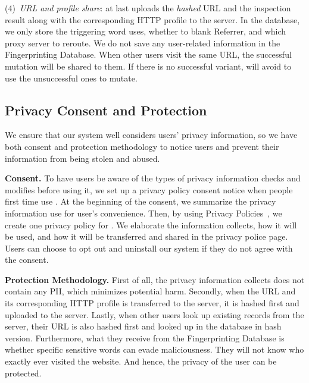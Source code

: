 (4)~\emph{URL and profile share}:
\spartacus at last uploads the \emph{hashed} URL and the inspection result along with the corresponding HTTP profile to the server.
In the database, we only store the triggering word \spartacus uses, whether to blank Referrer, and which proxy server to reroute.
We do not save any user-related information in the Fingerprinting Database.
When other users visit the same URL, the successful mutation will be shared to them.
If there is no successful variant, \spartacus will avoid to use the unsuccessful ones to mutate.


\subsection{Privacy Consent and Protection}

We ensure that our \spartacus system well considers users' privacy information,
so we have both consent and protection methodology to notice users and prevent their information from being stolen and abused.

\noindent
\textbf{Consent.}
To have users be aware of the types of privacy information \spartacus checks and modifies before using it,
we set up a privacy policy consent notice when people first time use \spartacus.
At the beginning of the consent, we summarize the privacy information \spartacus use for user's convenience.
Then, by using Privacy Policies~\cite{privacypolicy}, we create one privacy policy for \spartacus.
We elaborate the information \spartacus collects, how it will be used, and how it will be transferred and shared in the privacy police page.
Users can choose to opt out and uninstall our system if they do not agree with the consent.

\noindent
\textbf{Protection Methodology.}
First of all, the privacy information \spartacus collects does not contain any PII, which minimizes potential harm.
Secondly, when the URL and its corresponding HTTP profile is transferred to the server,
it is hashed first and uploaded to the server.
Lastly, when other users look up existing records from the server,
their URL is also hashed first and looked up in the database in hash version.
Furthermore, what they receive from the Fingerprinting Database is whether specific sensitive words can evade maliciousness.
They will not know who exactly ever visited the website.
And hence, the privacy of the user can be protected.